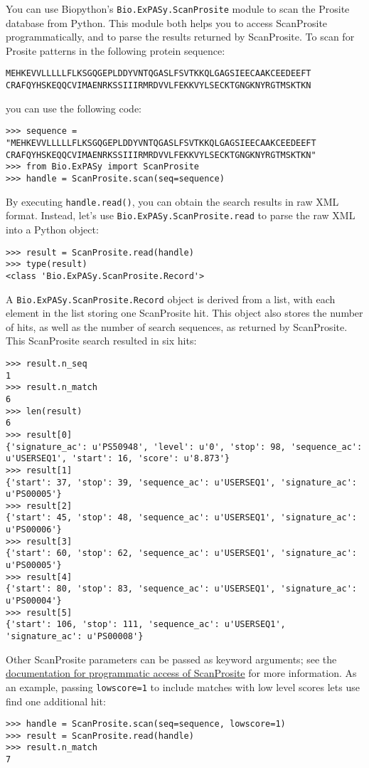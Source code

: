 You can use Biopython's \verb+Bio.ExPASy.ScanProsite+ module to scan the Prosite database from Python. This module both helps you to access ScanProsite programmatically, and to parse the results returned by ScanProsite. To scan for Prosite patterns in the following protein sequence:

\begin{verbatim}
MEHKEVVLLLLLFLKSGQGEPLDDYVNTQGASLFSVTKKQLGAGSIEECAAKCEEDEEFT
CRAFQYHSKEQQCVIMAENRKSSIIIRMRDVVLFEKKVYLSECKTGNGKNYRGTMSKTKN
\end{verbatim}

you can use the following code:

\begin{verbatim}
>>> sequence = "MEHKEVVLLLLLFLKSGQGEPLDDYVNTQGASLFSVTKKQLGAGSIEECAAKCEEDEEFT
CRAFQYHSKEQQCVIMAENRKSSIIIRMRDVVLFEKKVYLSECKTGNGKNYRGTMSKTKN"
>>> from Bio.ExPASy import ScanProsite
>>> handle = ScanProsite.scan(seq=sequence)
\end{verbatim}

By executing \verb+handle.read()+, you can obtain the search results in raw XML format. Instead, let's use \verb+Bio.ExPASy.ScanProsite.read+ to parse the raw XML into a Python object:

\begin{verbatim}
>>> result = ScanProsite.read(handle)
>>> type(result)
<class 'Bio.ExPASy.ScanProsite.Record'>
\end{verbatim}

A \verb+Bio.ExPASy.ScanProsite.Record+ object is derived from a list, with each element in the list storing one ScanProsite hit. This object also stores the number of hits, as well as the number of search sequences, as returned by ScanProsite. This ScanProsite search resulted in six hits:

\begin{verbatim}
>>> result.n_seq
1
>>> result.n_match
6
>>> len(result)
6
>>> result[0]
{'signature_ac': u'PS50948', 'level': u'0', 'stop': 98, 'sequence_ac': u'USERSEQ1', 'start': 16, 'score': u'8.873'}
>>> result[1]
{'start': 37, 'stop': 39, 'sequence_ac': u'USERSEQ1', 'signature_ac': u'PS00005'}
>>> result[2]
{'start': 45, 'stop': 48, 'sequence_ac': u'USERSEQ1', 'signature_ac': u'PS00006'}
>>> result[3]
{'start': 60, 'stop': 62, 'sequence_ac': u'USERSEQ1', 'signature_ac': u'PS00005'}
>>> result[4]
{'start': 80, 'stop': 83, 'sequence_ac': u'USERSEQ1', 'signature_ac': u'PS00004'}
>>> result[5]
{'start': 106, 'stop': 111, 'sequence_ac': u'USERSEQ1', 'signature_ac': u'PS00008'}
\end{verbatim}

Other ScanProsite parameters can be passed as keyword arguments; see the \href{https://prosite.expasy.org/scanprosite/scanprosite_doc.html#rest}{documentation for programmatic access of ScanProsite} for more information. As an example, passing \verb+lowscore=1+ to include matches with low level scores lets use find one additional hit:

\begin{verbatim}
>>> handle = ScanProsite.scan(seq=sequence, lowscore=1)
>>> result = ScanProsite.read(handle)
>>> result.n_match
7
\end{verbatim}
